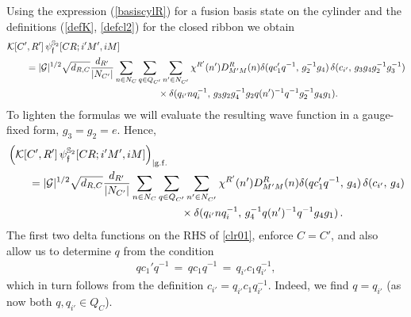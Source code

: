 \documentclass[nofootinbib,superscriptaddress,eqsecnum,tightenlines,11pt]{revtex4-1}
\def\nn{\nonumber}
\def\q{\qquad}
\def\mG{\mathcal{G}}
\def\ba{\begin{eqnarray}}
\def\ea{\end{eqnarray}}
\begin{document}
Using the expression (\ref{basiscylR}) for a fusion basis state on the cylinder and the definitions (\ref{defK}, \ref{defcl2}) for the closed ribbon we obtain
\begin{align}\label{clr01a}
	&{\cal K}[C',R'] \,\psi^{\mathbb{S}_2}_{\mathfrak f}[CR;i'M',iM] \nn\\
	&\q = |\mG|^{1/2}\sqrt{d_{R,C}} \frac{ d_{R'}} {|N_{C'}|} \sum_{n \in N_C}  \sum_{q \in Q_{C'}}\sum_{n'\in N_{C'}} \chi^{R'}(n') D^R_{M'M}(n) 
	 \delta(q c'_1 q^{-1},\, g_2^{-1} g_4) \, \delta( c_{i'},\, g_3g_4 g_2^{-1}g_3^{-1})  \nn\\
	& \q\q\q \q \q \q \q \q \times \delta( q_{i'} n q_{i}^{-1}, \, g_3 g_2 g_4^{-1} g_2 q (n')^{-1} q^{-1} g_2^{-1} g_4 g_1) .
\end{align}
To lighten the formulas we will evaluate the resulting wave function in a gauge-fixed form, $g_3=g_2=e$. Hence, 
\begin{align}\label{clr01}
	&\left({\cal K}[C',R'] \,\psi^{\mathbb{S}_2}_{\mathfrak f}[CR;i'M',iM] \right)_{|{\rm g.f.}} \nn\\
	&\q = |\mG|^{1/2}\sqrt{d_{R,C}} \frac{ d_{R'}} {|N_{C'}|} \sum_{n \in N_C}  \sum_{q \in Q_{C'}}\sum_{n'\in N_{C'}}\chi^{R'}(n') D^R_{M'M}(n) 
	\delta(q c'_1 q^{-1},\, g_4) \, \delta( c_{i'},\,g_4 ) \nn\\
	& \q\q\q \q \q \q \q \q \times \delta( q_{i'} n q_{i}^{-1}, \,  g_4^{-1}  q (n')^{-1} q^{-1}  g_4 g_1)\,. 
\end{align}
The first two delta functions on the RHS of \eqref{clr01}, enforce $C=C'$, and also allow us to determine $q$ from the condition
\ba
q c_1'q^{-1}\,=\, q c_1q^{-1}\,=\,  q_{i'} c_1 q_{i'}^{-1} ,
\ea
 which in turn follows from  the definition $c_{i'}=q_{i'} c_1 q_{i'}^{-1}$. Indeed, we find $q=q_{i'}$ (as now both $q,q_{i'}\in Q_C$).
\end{document}
